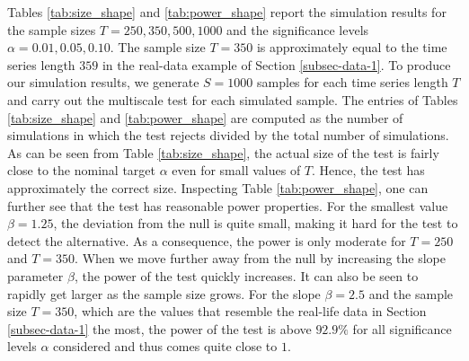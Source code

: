 Tables \ref{tab:size_shape} and \ref{tab:power_shape} report the simulation results for the sample sizes $T=250,350,500, 1000$ and the significance levels $\alpha = 0.01, 0.05, 0.10$. The sample size $T = 350$ is approximately equal to the time series length $359$ in the real-data example of Section \ref{subsec-data-1}. To produce our simulation results, we generate $S=1000$ samples for each time series length $T$ and carry out the multiscale test for each simulated sample. The entries of Tables \ref{tab:size_shape} and \ref{tab:power_shape} are computed as the number of simulations in which the test rejects divided by the total number of simulations. As can be seen from Table \ref{tab:size_shape}, the actual size of the test is fairly close to the nominal target $\alpha$ even for small values of $T$. Hence, the test has approximately the correct size. Inspecting Table \ref{tab:power_shape}, one can further see that the test has reasonable power properties. For the smallest value $\beta = 1.25$, the deviation from the null is quite small, making it hard for the test to detect the alternative. As a consequence, the power is only moderate for $T=250$ and $T=350$. When we move further away from the null by increasing the slope parameter $\beta$, the power of the test quickly increases. It can also be seen to rapidly get larger as the sample size grows. For the slope $\beta =2.5$ and the sample size $T=350$, which are the values that resemble the real-life data in Section \ref{subsec-data-1} the most, the power of the test is above $92.9\%$ for all significance levels $\alpha$ considered and thus comes quite close to $1$. 


